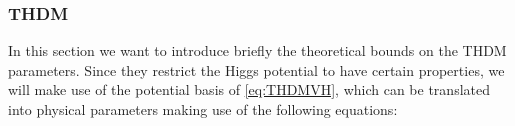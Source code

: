 \documentclass[preprint,3p,12pt]{elsarticle}
\begin{document}
%    





\subsubsection{THDM}

In this section we want to introduce briefly the theoretical bounds on the THDM parameters. Since they restrict the Higgs potential to have certain properties, we will make use of the potential basis of \eqref{eq:THDMVH}, which can be translated into physical parameters making use of the following equations:
\end{document}
